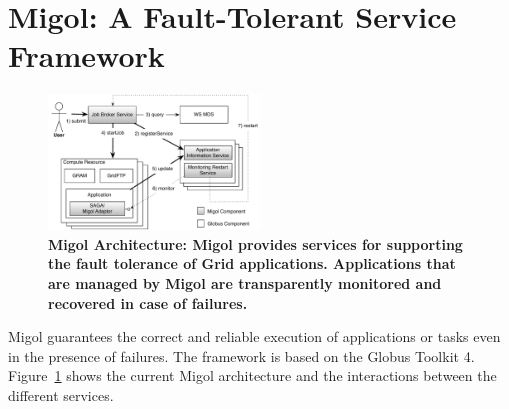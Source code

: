 \documentclass{rspublic}
\newcommand{\up}{}%
\begin{document}
\up
\section{Migol: A Fault-Tolerant Service Framework}     
\label{sec:migol}

\up
\begin{figure}[h]
 \centering
 \includegraphics[width=0.5\textwidth]{migol_architecture}
 \caption{\footnotesize \bf Migol Architecture: Migol provides services for
 supporting the fault tolerance of Grid applications. Applications that are managed by
 Migol are transparently monitored and recovered in case of
 failures.\up\up
 }
 \label{fig:migol_architecture} 
\end{figure}           


Migol guarantees the correct and reliable exe\-cution of applications
or tasks even in the presence of failures. The framework is based on
the Globus Toolkit 4.  Figure~\ref{fig:migol_architecture} shows the
current Migol architecture and the interactions between the different
services.
\end{document}
